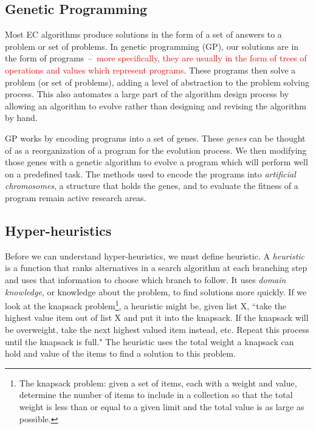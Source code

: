 \documentclass{sig-alternate}
\begin{document}
\subsection{Genetic Programming}
\label{sec:GP}
Most EC algorithms produce solutions in the form of a set of answers to a problem or set of problems. In genetic programming (GP), our solutions are in the form of programs~--~\textcolor{red}{more specifically, they are usually in the form of trees of operations and values which represent programs}.
 These programs then solve a problem (or set of problems), adding a level of abstraction to the problem solving process. This also automates a large part of the algorithm design process by allowing an algorithm to evolve rather than designing and revising the algorithm by hand.

GP works by encoding programs into a set of genes. These \textit{genes} can be thought of as a reorganization of a program for the evolution process. We then modifying those genes with a genetic algorithm to evolve a program which will perform well on a predefined task. The methods used to encode the programs into \textit{artificial chromosomes}, a structure that holds the genes, and to evaluate the fitness of a program remain active research areas.

\subsection{Hyper-heuristics}
\label{sec:HH}
Before we can understand hyper-heuristics, we must define heuristic. A \textit{heuristic} is a function that ranks alternatives in a search algorithm at each branching step and uses that information to choose which branch to follow. It uses \textit{domain knowledge}, or knowledge about the problem, to find solutions more quickly. If we look at the knapsack problem\footnote{The knapsack problem: given a set of items, each with a weight and value, determine the number of items to include in a collection so that the total weight is less than or equal to a given limit and the total value is as large as possible.}, a heuristic might be, given list X, ``take the highest value item out of list X and put it into the knapsack. If the knapsack will be overweight, take the next highest valued item instead, etc. Repeat this process until the knapsack is full." The heuristic uses the total weight a knapsack can hold and value of the items to find a solution to this problem.
\end{document}
